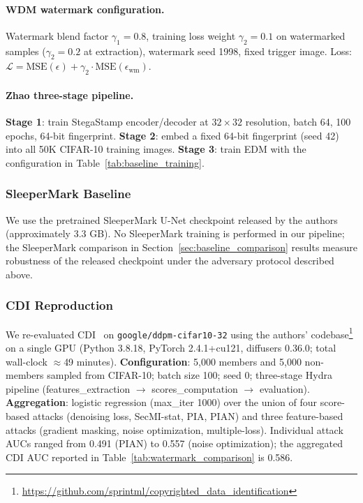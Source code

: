 \documentclass{article}
\begin{document}
\paragraph{WDM watermark configuration.} Watermark blend factor $\gamma_1 = 0.8$, training loss weight $\gamma_2 = 0.1$ on watermarked samples ($\gamma_2 = 0.2$ at extraction), watermark seed 1998, fixed trigger image. Loss: $\mathcal{L} = \mathrm{MSE}(\epsilon) + \gamma_2 \cdot \mathrm{MSE}(\epsilon_{\text{wm}})$.

\paragraph{Zhao three-stage pipeline.} \textbf{Stage 1}: train StegaStamp encoder/decoder at $32{\times}32$ resolution, batch 64, 100 epochs, 64-bit fingerprint. \textbf{Stage 2}: embed a fixed 64-bit fingerprint (seed 42) into all 50K CIFAR-10 training images. \textbf{Stage 3}: train EDM with the configuration in Table~\ref{tab:baseline_training}.

\subsubsection{SleeperMark Baseline}

We use the pretrained SleeperMark U-Net checkpoint released by the authors (approximately 3.3 GB). No SleeperMark training is performed in our pipeline; the SleeperMark comparison in Section~\ref{sec:baseline_comparison} results measure robustness of the released checkpoint under the adversary protocol described above.

\subsubsection{CDI Reproduction}

We re-evaluated CDI~\citep{dubinski2024cdi} on \texttt{google/ddpm-cifar10-32} using the authors' codebase\footnote{\url{https://github.com/sprintml/copyrighted_data_identification}} on a single GPU (Python 3.8.18, PyTorch 2.4.1+cu121, diffusers 0.36.0; total wall-clock $\approx$49 minutes). \textbf{Configuration}: 5{,}000 members and 5{,}000 non-members sampled from CIFAR-10; batch size 100; seed 0; three-stage Hydra pipeline (features\_extraction $\to$ scores\_computation $\to$ evaluation). \textbf{Aggregation}: logistic regression (max\_iter 1000) over the union of four score-based attacks (denoising loss, SecMI-stat, PIA, PIAN) and three feature-based attacks (gradient masking, noise optimization, multiple-loss). Individual attack AUCs ranged from 0.491 (PIAN) to 0.557 (noise optimization); the aggregated CDI AUC reported in Table~\ref{tab:watermark_comparison} is 0.586.
\end{document}
